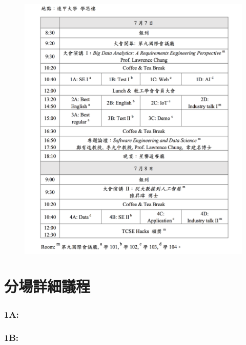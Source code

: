 \documentclass[12pt,oneside,a4paper]{book}
\begin{document}
%
\begin{figure}[h!]
\begin{center}
\includegraphics[width=.95\columnwidth]{images/program.png}
\end{center}
\end{figure}

\chapter*{分場詳細議程}
%

\subsection*{1A: \TitleOneA}
\subsubsection*{\ChairOneA}
\ListOneA

\subsection*{1B: \TitleOneB}
\end{document}
